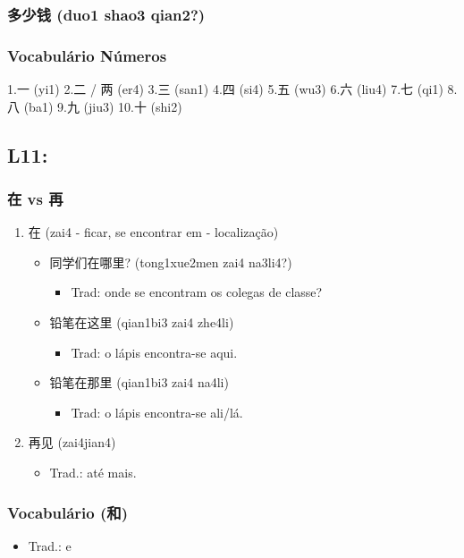 \documentclass[11pt]{article}
\begin{document}
\subsubsection{多少钱 (duo1 shao3 qian2?)}
\label{sec:orgd610c16}
\subsubsection{Vocabulário Números}
\label{sec:org38a4601}
1.一 (yi1)
2.二 / 两 (er4)
3.三 (san1)
4.四 (si4)
5.五 (wu3)
6.六 (liu4)
7.七 (qi1)
8.八 (ba1)
9.九 (jiu3)
10.十 (shi2)


\subsection{L11:}
\label{sec:orge8555b1}
\subsubsection{在 vs 再}
\label{sec:org91b60a4}
\begin{enumerate}
\item 在 (zai4 - ficar, se encontrar em - localização)
\label{sec:orgd19573c}
\begin{itemize}
\item 同学们在哪里? (tong1xue2men zai4 na3li4?)
\begin{itemize}
\item Trad: onde se encontram os colegas de classe?
\end{itemize}
\item 铅笔在这里 (qian1bi3 zai4 zhe4li)
\begin{itemize}
\item Trad: o lápis encontra-se aqui.
\end{itemize}
\item 铅笔在那里 (qian1bi3 zai4 na4li)
\begin{itemize}
\item Trad: o lápis encontra-se ali/lá.
\end{itemize}
\end{itemize}
\item 再见 (zai4jian4)
\label{sec:orge12d05b}
\begin{itemize}
\item Trad.: até mais.
\end{itemize}
\end{enumerate}

\subsubsection{Vocabulário (和)}
\label{sec:orga7736b4}
\begin{itemize}
\item Trad.: e
\end{itemize}
\end{document}
